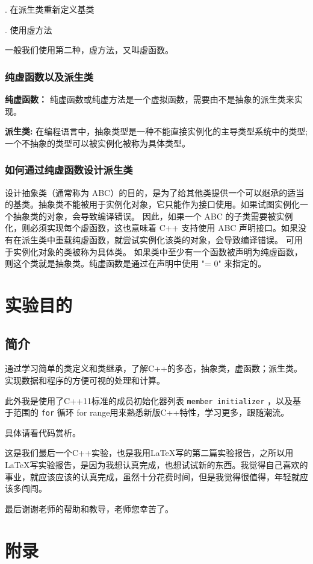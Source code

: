 \documentclass[UTF8,18pt]{ctexart}
\begin{document}
. 在派生类重新定义基类 

. 使用虚方法 

一般我们使用第二种，虚方法，又叫虚函数。
\subsubsection{纯虚函数以及派生类}

\textbf{纯虚函数：}
纯虚函数或纯虚方法是一个虚拟函数，需要由不是抽象的派生类来实现。

\textbf{派生类:}
在编程语言中，抽象类型是一种不能直接实例化的主导类型系统中的类型;一个不抽象的类型可以被实例化被称为具体类型。
\subsubsection{如何通过纯虚函数设计派生类}
设计抽象类（通常称为 ABC）的目的，是为了给其他类提供一个可以继承的适当的基类。抽象类不能被用于实例化对象，它只能作为接口使用。如果试图实例化一个抽象类的对象，会导致编译错误。
因此，如果一个 ABC 的子类需要被实例化，则必须实现每个虚函数，这也意味着 C++ 支持使用 ABC 声明接口。如果没有在派生类中重载纯虚函数，就尝试实例化该类的对象，会导致编译错误。
可用于实例化对象的类被称为具体类。
如果类中至少有一个函数被声明为纯虚函数，则这个类就是抽象类。纯虚函数是通过在声明中使用 "= 0" 来指定的。
\section{实验目的}
\subsection{简介}
通过学习简单的类定义和类继承，了解C++的多态，抽象类，虚函数；派生类。实现数据和程序的方便可视的处理和计算。

此外我是使用了C++11标准的成员初始化器列表 \texttt{member initializer} ，以及基于范围的 \texttt{for} 循环 for range用来熟悉新版C++特性，学习更多，跟随潮流。

具体请看代码赏析。

这是我们最后一个C++实验，也是我用\LaTeX 写的第二篇实验报告，之所以用 \LaTeX 写实验报告，是因为我想认真完成，也想试试新的东西。我觉得自己喜欢的事业，就应该应该的认真完成，虽然十分花费时间，但是我觉得很值得，年轻就应该多闯闯。

最后谢谢老师的帮助和教导，老师您幸苦了。

\section{附录}
\end{document}
